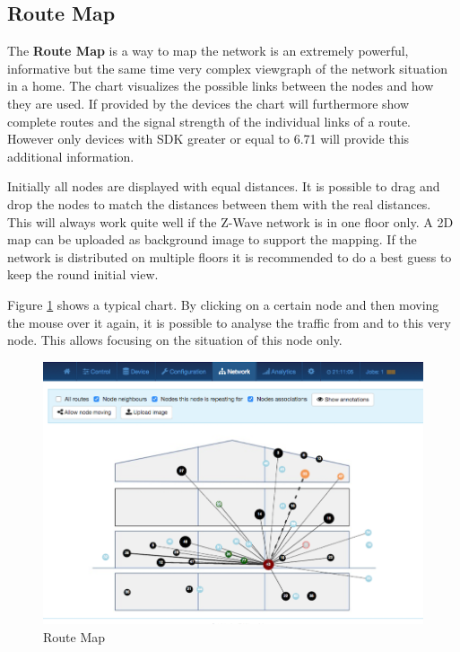 \subsection{Route Map}

The \textbf{Route Map} is a way to map the network is an extremely powerful, informative but the same time very complex
viewgraph of the network situation in a home.  The chart visualizes the possible links between
the nodes and how they are used. If provided by the devices the chart will furthermore show
complete routes and the signal strength of the individual links of a route. However only 
devices with SDK greater or equal to 6.71 will provide this additional information.
 
Initially all nodes are displayed with equal distances. It is possible to drag and drop
the nodes to match the distances between them with the real distances. This will always 
work quite well if the Z-Wave network is in one floor only. 
A 2D map can be uploaded as background image to support the mapping.
If the network is distributed  on multiple floors it is recommended to do a best guess 
to keep the round initial view.

Figure \ref{c5:routemap} shows a typical chart. By clicking on a certain node and then 
moving the mouse over it again, it is possible to analyse the traffic from and to this 
very node. This allows focusing on the situation of this node only.

\begin{figure}
\begin{center}
\includegraphics[width=1.0\textwidth]{pngs/cap7/eui24.png}
\caption {Route Map}
\label{c5:routemap}
\end{center}
\end{figure}

